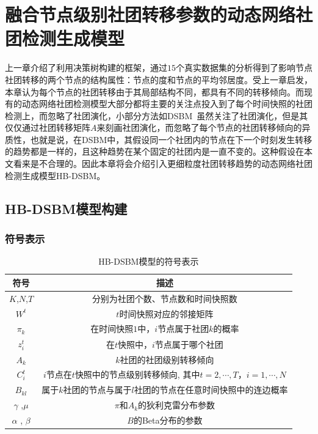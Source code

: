 \chapter{融合节点级别社团转移参数的动态网络社团检测生成模型}

上一章介绍了利用决策树构建的框架，通过$15$个真实数据集的分析得到了影响节点社团转移的两个节点的结构属性：节点的度和节点的平均邻居度。受上一章启发，本章认为每个节点的社团转移由于其局部结构不同，都具有不同的转移倾向。而现有的动态网络社团检测模型大部分都将主要的关注点投入到了每个时间快照的社团检测上，而忽略了社团演化，小部分方法如DSBM~\cite{yang2011detecting}虽然关注了社团演化，但是其仅仅通过社团转移矩阵$A$来刻画社团演化，而忽略了每个节点的社团转移倾向的异质性，也就是说，在DSBM中，其假设同一个社团内的节点在下一个时刻发生转移的趋势都是一样的，且这种趋势在某个固定的社团内是一直不变的。这种假设在本文看来是不合理的。因此本章将会介绍引入更细粒度社团转移趋势的动态网络社团检测生成模型HB-DSBM。
\section{HB-DSBM模型构建}

\subsection{符号表示}
\begin{table}
	\centering
	\caption{HB-DSBM模型的符号表示}\label{tab.4.1}
	\begin{tabular}{cc}
		\hline
		{\bfseries 符号} &  { \bfseries 描述} \\
		\hline
		$K$,$N$,$T$ & 分别为社团个数、节点数和时间快照数 \\
		\hline
		$W^{t}$ & $t$时间快照对应的邻接矩阵\\
		\hline
		$\pi_k$ & 在时间快照$1$中，$i$节点属于社团$k$的概率\\
		$z_i^{t}$ & 在$t$快照中，$i$节点属于哪个社团 \\
		${A}_k$ & $k$社团的社团级别转移倾向 \\
		${C}_i^{t}$ & $i$节点在$t$快照中的节点级别转移倾向, 其中$t=2, \cdots, T$，$i=1, \cdots, N$\\
		$B_{kl}$ & 属于$k$社团的节点与属于$l$社团的节点在任意时间快照中的连边概率\\
		\hline
		${\gamma}$ ,${\mu}$ & ${\pi}$和${A}_k$的狄利克雷分布参数 \\
		${\alpha}$ , ${\beta}$ & $B$的Beta分布的参数 \\   
		\hline
	\end{tabular}
\end{table}

